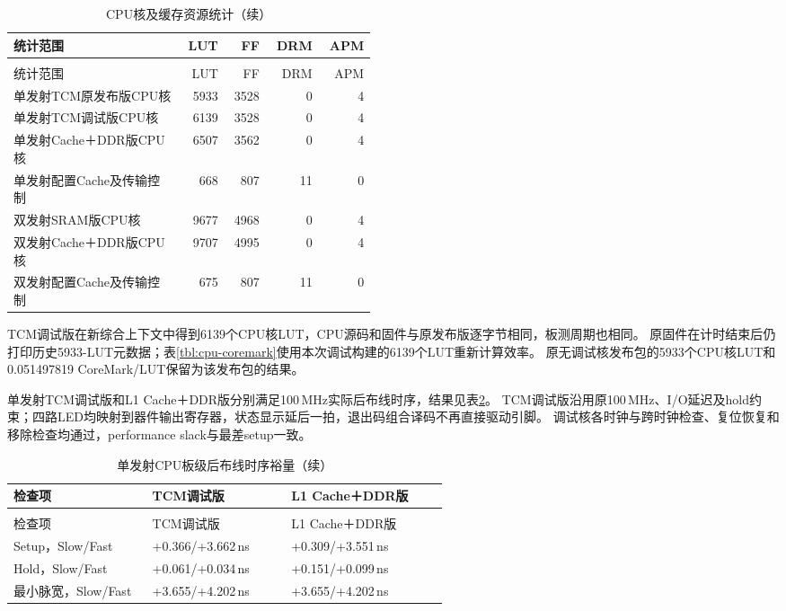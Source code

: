 \begin{reporttable}
\begin{longtable}{@{}p{0.47\linewidth}rrrr@{}}
\caption{CPU核及缓存资源统计}\label{tbl:cpu-resources}\\
\toprule
统计范围 & LUT & FF & DRM & APM \\
\midrule
\endfirsthead
\caption[]{CPU核及缓存资源统计（续）}\\
\toprule
统计范围 & LUT & FF & DRM & APM \\
\midrule
\endhead
\bottomrule
\endfoot
单发射TCM原发布版CPU核 & 5933 & 3528 & 0 & 4 \\
单发射TCM调试版CPU核 & 6139 & 3528 & 0 & 4 \\
单发射Cache＋DDR版CPU核 & 6507 & 3562 & 0 & 4 \\
单发射配置Cache及传输控制 & 668 & 807 & 11 & 0 \\
双发射SRAM版CPU核 & 9677 & 4968 & 0 & 4 \\
双发射Cache＋DDR版CPU核 & 9707 & 4995 & 0 & 4 \\
双发射配置Cache及传输控制 & 675 & 807 & 11 & 0 \\
\end{longtable}
\end{reporttable}

TCM调试版在新综合上下文中得到6139个CPU核LUT，CPU源码和固件与原发布版逐字节相同，板测周期也相同。
原固件在计时结束后仍打印历史5933-LUT元数据；表\ref{tbl:cpu-coremark}使用本次调试构建的6139个LUT重新计算效率。
原无调试核发布包的5933个CPU核LUT和0.051497819 CoreMark/LUT保留为该发布包的结果。

单发射TCM调试版和L1 Cache＋DDR版分别满足100\,MHz实际后布线时序，结果见表\ref{tbl:cpu-board-timing}。
TCM调试版沿用原100\,MHz、I/O延迟及hold约束；四路LED均映射到器件输出寄存器，状态显示延后一拍，退出码组合译码不再直接驱动引脚。
调试核各时钟与跨时钟检查、复位恢复和移除检查均通过，performance slack与最差setup一致。

\begin{reporttable}
\begin{longtable}{@{}p{0.30\linewidth}p{0.30\linewidth}p{0.34\linewidth}@{}}
\caption{单发射CPU板级后布线时序裕量}\label{tbl:cpu-board-timing}\\
\toprule
检查项 & TCM调试版 & L1 Cache＋DDR版 \\
\midrule
\endfirsthead
\caption[]{单发射CPU板级后布线时序裕量（续）}\\
\toprule
检查项 & TCM调试版 & L1 Cache＋DDR版 \\
\midrule
\endhead
\bottomrule
\endfoot
Setup，Slow/Fast & +0.366/+3.662\,ns & +0.309/+3.551\,ns \\
Hold，Slow/Fast & +0.061/+0.034\,ns & +0.151/+0.099\,ns \\
最小脉宽，Slow/Fast & +3.655/+4.202\,ns & +3.655/+4.202\,ns \\
\end{longtable}
\end{reporttable}

